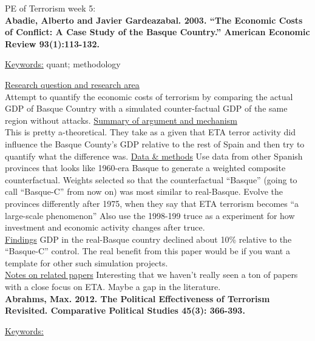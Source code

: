 \documentclass{article}[12pt]
\begin{document}
PE of Terrorism week 5:\\

\textbf{Abadie, Alberto and Javier Gardeazabal. 2003. “The Economic Costs of Conflict: A Case
Study of the Basque Country.” American Economic Review 93(1):113-132.}

\underline{Keywords:} quant; methodology

\underline{Research question and research area} \\ Attempt to quantify the economic costs of terrorism by comparing the actual GDP of Basque Country with a simulated counter-factual GDP of the same region without attacks. 
\underline{Summary of argument and mechanism}\\  This is pretty a-theoretical. They take as a given that ETA terror activity did influence the Basque County's GDP relative to the rest of Spain and then try to quantify what the difference was.
\underline{Data \& methods} Use data from other Spanish provinces that looks like 1960-era Basque to generate a weighted composite counterfactual. Weights selected so that the counterfactual ``Basque'' (going to call ``Basque-C'' from now on) was most similar to real-Basque. Evolve the provinces differently after 1975, when they say that ETA terrorism becomes ``a large-scale phenomenon'' Also use the 1998-199 truce as a experiment for how investment and economic activity changes after truce.\\
\underline{Findings} GDP in the real-Basque country declined about 10\% relative to the ``Basque-C'' control.  The real benefit from this paper would be if you want a template for other such simulation projects.\\
\underline{Notes on related papers} Interesting that we haven't really seen a ton of papers with a close focus on ETA. Maybe a gap in the literature. \\


\textbf{Abrahms, Max. 2012. The Political Effectiveness of Terrorism Revisited. Comparative Political Studies 45(3): 366-393.}


\underline{Keywords:}
\end{document}
